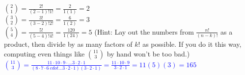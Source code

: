 \documentclass{ximera}
\begin{document}
\begin{exercise}
\begin{enumerate}
{        ${2 \choose 1}=\frac{2!}{(2-1)!1!}=\frac{2}{1(1)}=2$\\
        ${3\choose 2}=\frac{3!}{(3-2)!2!}=\frac{6}{1(2)}=3$\\
        ${5\choose 4}=\frac{5!}{(5-4)!4!}=\frac{120}{1(24)}=5$}
        (Hint: Lay out the numbers from $\frac{n!}{(n-k)!}$ as a product, then divide by as many factors of $k!$ as possible.  If you do it this way, computing even things like $11\choose 3$ by hand won't be too bad.) \\
        \textcolor{blue}{${11\choose 3}=\frac{11\cdot 10\cdot 9\cdot \dots 3 \cdot 2 \cdot 1}{(8\cdot 7 \cdot 6\ cdot \dots 3\cdot 2\cdot 1)(3\cdot 2 \cdot 1)}=\frac{11\cdot 10 \cdot 9}{3\cdot 2 \cdot 1}=11(5)(3)=165$}
    \end{enumerate}
\end{exercise}
\end{document}
